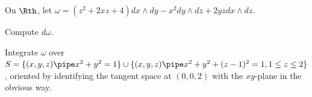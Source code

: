 On $\Rth$, let $\omega=(z^2+2xz+4)dx\wedge dy-x^2 dy\wedge
dz+2yzdx\wedge dz$.
\begin{alist}
\item Compute $d\omega$.
\item Integrate $\omega$ over $S=\{(x,y,z)\pipe x^2+y^2=1\}\cup
\{(x,y,z)\pipe x^2+y^2+(z-1)^2=1,1\leq z\leq 2\}$, oriented 
by identifying the tangent space at $(0,0,2)$ with the $xy$-plane in
the obvious way.
\end{alist}
